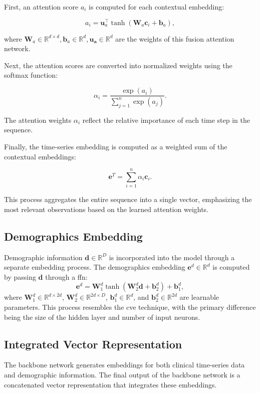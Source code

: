 First, an attention score \(a_i\) is computed for each contextual embedding:

\[
a_i = \mathbf{u}_a^\top \tanh(\mathbf{W}_a \mathbf{c}_i + \mathbf{b}_a),
\]

where $\mathbf{W}_a\in \mathbb{R}^{d \times d}, \mathbf{b}_a\in\mathbb{R}^{d}, \mathbf{u_a}\in\mathbb{R}^{d}$ are the weights of this fusion attention network.

Next, the attention scores are converted into normalized weights using the softmax function:

\[
\alpha_i = \frac{\exp(a_i)}{\sum_{j=1}^{n} \exp(a_j)}.
\]

The attention weights \(\alpha_i\) reflect the relative importance of each time step in the sequence.

Finally, the time-series embedding is computed as a weighted sum of the contextual embeddings:

\[
\mathbf{e}^T = \sum_{i=1}^{n} \alpha_i \mathbf{c}_i.
\]

This process aggregates the entire sequence into a single vector, emphasizing the most relevant observations based on the learned attention weights.

\subsection{Demographics Embedding}
\label{sec:demographics_embedding}

Demographic information \(\mathbf{d} \in \mathbb{R}^D\) is incorporated into the model through a separate embedding process. The demographics embedding \(\mathbf{e}^d \in \mathbb{R}^d\) is computed by passing \(\mathbf{d}\) through a \gls{ffn}:
\[
\mathbf{e}^d = \mathbf{W}_1^d \tanh\left( \mathbf{W}_2^d \mathbf{d} + \mathbf{b}_2^d \right) + \mathbf{b}_1^d,
\]
where \(\mathbf{W}_1^d \in \mathbb{R}^{d \times 2d}\), \(\mathbf{W}_2^d \in \mathbb{R}^{2d \times D}\), \(\mathbf{b}_1^d \in \mathbb{R}^{d}\), and \(\mathbf{b}_2^d \in \mathbb{R}^{2d}\) are learnable parameters. This process resembles the \gls{cve} technique, with the primary difference being the size of the hidden layer and number of input neurons.


\subsection{Integrated Vector Representation}

The backbone network generates embeddings for both clinical time-series data and demographic information. The final output of the backbone network is a concatenated vector representation that integrates these embeddings.

